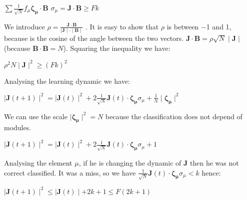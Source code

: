 \documentclass[paper=9in:6in,pagesize=pdftex,headinclude=on,footinclude=on,10pt,bibtotoc,pointlessnumbers,normalheadings,DIV=9,twoside=false]{scrbook}
\begin{document}
\begin{center}
    $\sum \frac{1}{\sqrt{N}} f_{\mu} \boldsymbol{\zeta_{\mu}}\cdot \mathbf{B}$ $\sigma_{\mu} = \mathbf{J}\cdot \mathbf{B} \geq Fk  $
\end{center}

\begin{text}
We introduce $\rho = \frac{\mathbf{J}\cdot \mathbf{B}}{\mid \mathbf{J}\mid \cdot \mid \mathbf{B} \mid }$
. It is easy to show that $\rho$ is between −1 and 1, because
is the cosine of the angle between the two vectors. $\mathbf{J}\cdot \mathbf{B} = \rho \sqrt{N} \mid \mathbf{J} \mid $ (because $\mathbf{B} \cdot \mathbf{B}=N$). Squaring the inequality we have:
\end{text}

\begin{center}
    $\rho^2 N \mid \mathbf{J} \mid^2 \geq (Fk)^2$\\
\end{center}

\begin{text}
Analysing the learning dynamic we have: \\
\end{text}

\begin{center}
    $\mid \mathbf{J}(t+1) \mid ^2 = \mid \mathbf{J}(t) \mid^2 + 2 \frac{1}{\sqrt{N}} \mathbf{J}(t)\cdot \boldsymbol{\zeta_{\mu}} \sigma_{\mu} + \frac{1}{N} \mid \boldsymbol{\zeta_{\mu}} \mid^2$
\end{center}

\begin{text}
We can use the scale $\mid \boldsymbol{\zeta_{\mu}} \mid^2 = N$ because the classification does not depend of modules. \\
\end{text}

\begin{center}
    $\mid \mathbf{J}(t+1) \mid ^2 = \mid \mathbf{J}(t) \mid^2 + 2 \frac{1}{\sqrt{N}} \mathbf{J}(t)\cdot \boldsymbol{\zeta_{\mu}} \sigma_{\mu} + 1 $
\end{center}

\begin{text}
Analysing the element $\mu$, if he is changing the dynamic of \textbf{J} then he was not correct classified. It was a miss, so we have $ \frac{1}{\sqrt{N}}\textbf{J}(t)\cdot \boldsymbol{\zeta_{\mu}}\sigma_{\mu} < k$ hence:
\end{text}

\begin{center}
    $\mid \mathbf{J}(t+1) \mid ^2 \leq \mid \mathbf{J}(t) \mid + 2k +1 \leq F(2k+1)$
\end{center}
\end{document}
